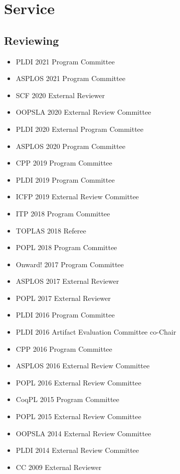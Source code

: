 \documentclass[10pt]{article}
\begin{document}


\section*{Service}

\subsection*{Reviewing}

\begin{itemize}
  \item PLDI 2021 Program Committee
  \item ASPLOS 2021 Program Committee
  \item SCF 2020 External Reviewer
  \item OOPSLA 2020 External Review Committee
  \item PLDI 2020 External Program Committee
  \item ASPLOS 2020 Program Committee
  \item CPP 2019 Program Committee
  \item PLDI 2019 Program Committee
  \item ICFP 2019 External Review Committee
  \item ITP 2018 Program Committee
  \item TOPLAS 2018 Referee
  \item POPL 2018 Program Committee
  \item Onward! 2017 Program Committee
  \item ASPLOS 2017 External Reviewer
  \item POPL 2017 External Reviewer
  \item PLDI 2016 Program Committee
  \item PLDI 2016 Artifact Evaluation Committee co-Chair
  \item CPP 2016 Program Committee
  \item ASPLOS 2016 External Review Committee
  \item POPL 2016 External Review Committee
  \item CoqPL 2015 Program Committee
  \item POPL 2015 External Review Committee
  \item OOPSLA 2014 External Review Committee
  \item PLDI 2014 External Review Committee
  \item CC 2009 External Reviewer
\end{itemize}
\end{document}
